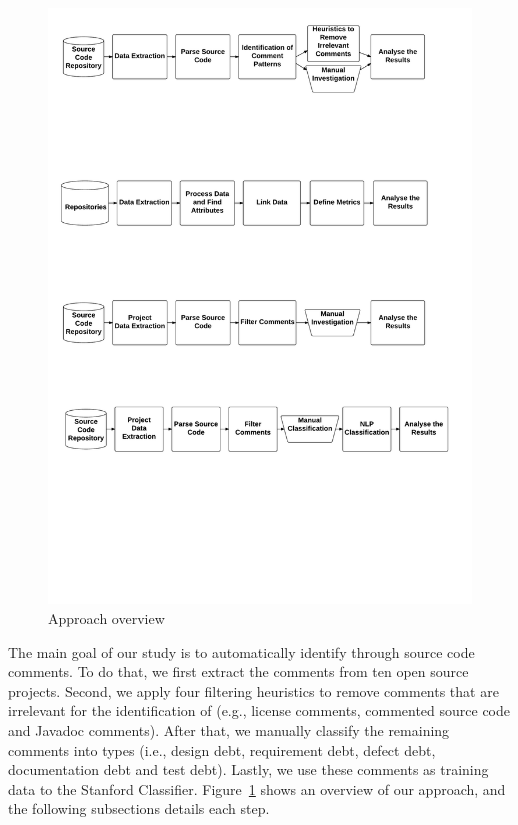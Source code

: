 \begin{figure}[thb!]
  \centering
  \includegraphics[width=1\textwidth]{figures/approach.pdf}
  \caption{Approach overview}
  \label{fig:approach}
\end{figure}

The main goal of our study is to automatically identify \SATD through source code comments. To do that, we first extract the comments from ten open source projects. Second, we apply four filtering heuristics to remove comments that are irrelevant for the identification of \SATD  (e.g., license comments, commented source code and Javadoc comments). After that, we manually classify the remaining comments into \SATD types (i.e., design debt, requirement debt, defect debt, documentation debt and test debt). Lastly, we use these comments as training data to the Stanford  Classifier. Figure~\ref{fig:approach} shows an overview of our approach, and the following subsections details each step.

